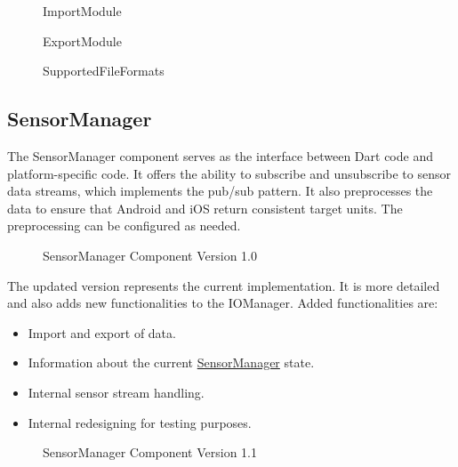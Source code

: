 \documentclass[12pt]{article}
\begin{document}
\begin{figure}[ht]
\centering

\caption{\label{fig:bild16} ImportModule}
\end{figure}

\begin{figure}[ht]
\centering

\caption{\label{fig:bild17} ExportModule}
\end{figure}

\begin{figure}[ht]
\centering

\caption{\label{fig:bild18} SupportedFileFormats}
\end{figure}

\newpage
\null
\newpage

\subsection{SensorManager}
\label{sec:CSensorManager}
The SensorManager component serves as the interface between Dart code and platform-specific code. It offers the ability to subscribe and unsubscribe to sensor data streams, which implements the pub/sub pattern. It also preprocesses the data to ensure that Android and iOS return consistent target units. The preprocessing can be configured as needed.
\begin{figure}[ht]
\centering

\caption{\label{fig:bild19} SensorManager Component Version 1.0}
\end{figure}
\newpage

The updated version represents the current implementation. It is more detailed and also adds new functionalities to the IOManager. Added functionalities are:   
\begin{itemize}
  \item Import and export of data.
  \item Information about the current \hyperref[sec:SensorManager]{SensorManager} state.
  \item Internal sensor stream handling.
  \item Internal redesigning for testing purposes. 
\end{itemize}

\begin{figure}[ht]

\caption{\label{fig:bild20} SensorManager Component Version 1.1}
\end{figure}
\newpage
\end{document}
